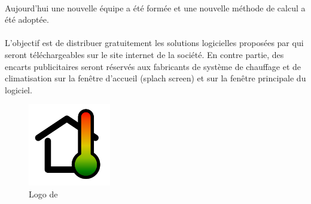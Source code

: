 	\paragraph{}
	Aujourd'hui une nouvelle équipe a été formée et une nouvelle méthode de calcul a été adoptée.

	\paragraph{}
	L'objectif est de distribuer gratuitement les solutions logicielles proposées par \K{} qui 
	seront téléchargeables sur le site internet de la société.  En contre partie, des encarts 
	publicitaires seront réservés aux fabricants de système de chauffage et de climatisation sur 
	la fenêtre d’accueil (splach screen) et sur la fenêtre principale du logiciel.

  \begin{figure}[H]
	  \begin{center}
	\includegraphics[width=3.6cm]{images/logo.png}
	  \end{center}
	  \caption{Logo de \K{}}
	  \label{fig:logo}
  \end{figure}

